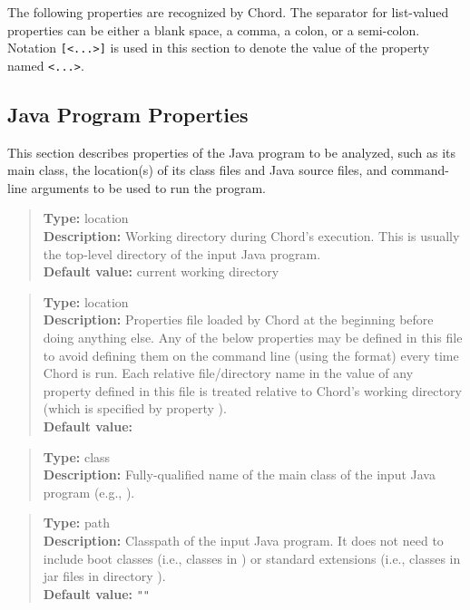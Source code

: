 The following properties are recognized by Chord.
The separator for list-valued properties can be either a blank space, a comma, a colon, or a semi-colon.
Notation {\tt [<...>]} is used in this section to denote the value of the property named {\tt <...>}.

\subsection{Java Program Properties} 
\label{sec:program-props}

This section describes properties of the Java program to be analyzed, such as
its main class, the location(s) of its class files and Java source
files, and command-line arguments to be used to run the program.
\\[10pt]

\begin{quote}
{\bf Type:} location \\
{\bf Description:} Working directory during Chord's execution.  This is
usually the top-level directory of the input Java program. \\
{\bf Default value:} current working directory
\end{quote}

\begin{quote}
{\bf Type:} location \\
{\bf Description:} Properties file loaded by Chord at the
beginning before doing anything else.  Any of the below properties may
be defined in this file to avoid defining them on the command line
(using the  format) every time Chord is run.
Each relative file/directory name in the value of any property defined
in this file is treated relative to Chord's working directory (which
is specified by property ). \\
{\bf Default value:} 
\end{quote}

\begin{quote}
{\bf Type:} class \\
{\bf Description:} Fully-qualified name of the main class of the input Java program (e.g., ).
\end{quote}

\begin{quote}
{\bf Type:} path \\
{\bf Description:} Classpath of the input Java program.  It does not need to include
boot classes (i.e., classes in ) or
standard extensions (i.e., classes in jar files in directory ). \\
{\bf Default value:} {\tt ""}
\end{quote}

